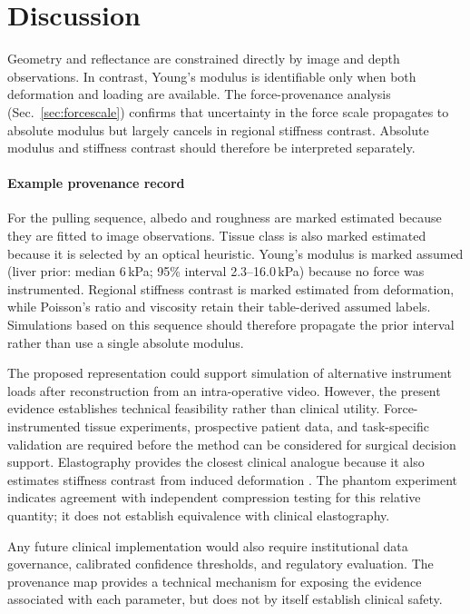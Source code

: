 \documentclass[smallextended]{svjour3}
\begin{document}
\section{Discussion}
\label{sec:discussion}

Geometry and reflectance are constrained directly by image and depth
observations. In contrast, Young's modulus is identifiable only when both
deformation and loading are available. The force-provenance analysis
(Sec.~\ref{sec:forcescale}) confirms that uncertainty in the force scale
propagates to absolute modulus but largely cancels in regional stiffness
contrast. Absolute modulus and stiffness contrast should therefore be
interpreted separately.

\paragraph{Example provenance record}
For the pulling sequence, albedo and roughness are marked estimated because
they are fitted to image observations. Tissue class is also marked estimated
because it is selected by an optical heuristic. Young's modulus is marked
assumed (liver prior: median 6\,kPa; 95\% interval 2.3--16.0\,kPa) because
no force was instrumented. Regional stiffness contrast is marked estimated
from deformation, while Poisson's ratio and viscosity retain their
table-derived assumed labels. Simulations based on this sequence should
therefore propagate the prior interval rather than use a single absolute
modulus.

The proposed representation could support simulation of alternative
instrument loads after reconstruction from an intra-operative video.
However, the present evidence establishes technical feasibility rather
than clinical utility. Force-instrumented tissue experiments, prospective
patient data, and task-specific validation are required before the method
can be considered for surgical decision support. Elastography provides the
closest clinical analogue because it also estimates stiffness contrast
from induced deformation \cite{ophir1991}. The phantom experiment indicates
agreement with independent compression testing for this relative
quantity; it does not establish equivalence with clinical elastography.

Any future clinical implementation would also require institutional data
governance, calibrated confidence thresholds, and regulatory evaluation.
The provenance map provides a technical mechanism for exposing the
evidence associated with each parameter, but does not by itself establish
clinical safety.
\end{document}

